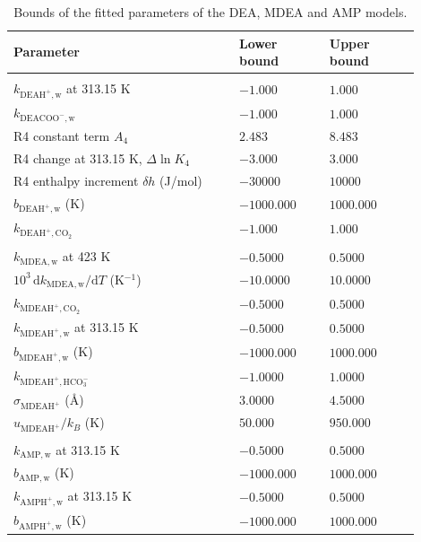 \begin{table}[!htbp]\small\setlength{\tabcolsep}{2pt}\caption{Bounds of the fitted parameters of the DEA, MDEA and AMP models.}\label{tab:supplement-transfer-bounds}
\begin{tabular}{@{}>{\raggedright\arraybackslash}p{0.5\linewidth}>{\raggedright\arraybackslash}p{0.2\linewidth}>{\raggedright\arraybackslash}p{0.2\linewidth}@{}}
\toprule Parameter & Lower bound & Upper bound \\ \midrule
\addlinespace\multicolumn{3}{@{}l}{\textit{DEA}} \\*
$k_{\mathrm{DEAH^+,w}}$ at 313.15 K & $-1.000$ & $1.000$ \\
$k_{\mathrm{DEACOO^-,w}}$ & $-1.000$ & $1.000$ \\
R4 constant term $A_4$ & $2.483$ & $8.483$ \\
R4 change at 313.15 K, $\Delta\ln K_4$ & $-3.000$ & $3.000$ \\
R4 enthalpy increment $\delta h$ (J/mol) & $\num{-30000}$ & $\num{10000}$ \\
$b_{\mathrm{DEAH^+,w}}$ (K) & $-1000.000$ & $1000.000$ \\
$k_{\mathrm{DEAH^+,CO_2}}$ & $-1.000$ & $1.000$ \\
\addlinespace\multicolumn{3}{@{}l}{\textit{MDEA}} \\*
$k_{\mathrm{MDEA,w}}$ at 423 K & $-0.5000$ & $0.5000$ \\
$10^{3}\,\mathrm{d}k_{\mathrm{MDEA,w}}/\mathrm{d}T$ (K$^{-1}$) & $-10.0000$ & $10.0000$ \\
$k_{\mathrm{MDEAH^+,CO_2}}$ & $-0.5000$ & $0.5000$ \\
$k_{\mathrm{MDEAH^+,w}}$ at 313.15 K & $-0.5000$ & $0.5000$ \\
$b_{\mathrm{MDEAH^+,w}}$ (K) & $-1000.000$ & $1000.000$ \\
$k_{\mathrm{MDEAH^+,HCO_3^-}}$ & $-1.0000$ & $1.0000$ \\
$\sigma_{\mathrm{MDEAH^+}}$ (\AA) & $3.0000$ & $4.5000$ \\
$u_{\mathrm{MDEAH^+}}/k_B$ (K) & $50.000$ & $950.000$ \\
\addlinespace\multicolumn{3}{@{}l}{\textit{AMP}} \\*
$k_{\mathrm{AMP,w}}$ at 313.15 K & $-0.5000$ & $0.5000$ \\
$b_{\mathrm{AMP,w}}$ (K) & $-1000.000$ & $1000.000$ \\
$k_{\mathrm{AMPH^+,w}}$ at 313.15 K & $-0.5000$ & $0.5000$ \\
$b_{\mathrm{AMPH^+,w}}$ (K) & $-1000.000$ & $1000.000$ \\

\end{tabular}
\end{table}
